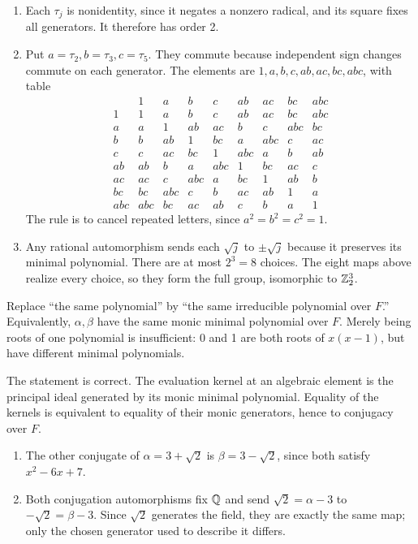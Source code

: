 \begin{enumerate}[label=(\alph*)]
\item Each $\tau_j$ is nonidentity, since it negates a nonzero radical, and its square fixes all generators. It therefore has order 2.
\item Put $a=\tau_2,b=\tau_3,c=\tau_5$. They commute because independent sign changes commute on each generator. The elements are $1,a,b,c,ab,ac,bc,abc$, with table
\[
\begin{array}{c|rrrrrrrr}
 &1&a&b&c&ab&ac&bc&abc\\\hline
1&1&a&b&c&ab&ac&bc&abc\\
a&a&1&ab&ac&b&c&abc&bc\\
b&b&ab&1&bc&a&abc&c&ac\\
c&c&ac&bc&1&abc&a&b&ab\\
ab&ab&b&a&abc&1&bc&ac&c\\
ac&ac&c&abc&a&bc&1&ab&b\\
bc&bc&abc&c&b&ac&ab&1&a\\
abc&abc&bc&ac&ab&c&b&a&1
\end{array}
\]
The rule is to cancel repeated letters, since $a^2=b^2=c^2=1$.
\item Any rational automorphism sends each $\sqrt j$ to $\pm\sqrt j$ because it preserves its minimal polynomial. There are at most $2^3=8$ choices. The eight maps above realize every choice, so they form the full group, isomorphic to $\mathbb{Z}_2^3$.
\end{enumerate}

Replace ``the same polynomial'' by ``the same irreducible polynomial over $F$.'' Equivalently, $\alpha,\beta$ have the same monic minimal polynomial over $F$. Merely being roots of one polynomial is insufficient: 0 and 1 are both roots of $x(x-1)$, but have different minimal polynomials.

The statement is correct. The evaluation kernel at an algebraic element is the principal ideal generated by its monic minimal polynomial. Equality of the kernels is equivalent to equality of their monic generators, hence to conjugacy over $F$.

\begin{enumerate}[label=(\alph*)]
\item The other conjugate of $\alpha=3+\sqrt2$ is $\beta=3-\sqrt2$, since both satisfy $x^2-6x+7$.
\item Both conjugation automorphisms fix $\mathbb{Q}$ and send $\sqrt2=\alpha-3$ to $-\sqrt2=\beta-3$. Since $\sqrt2$ generates the field, they are exactly the same map; only the chosen generator used to describe it differs.
\end{enumerate}

